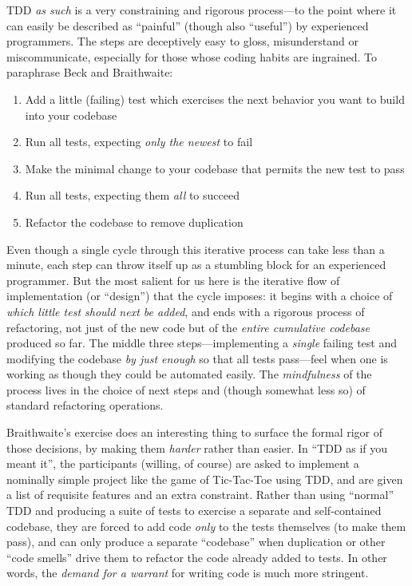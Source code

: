 TDD \emph{as such} is a very constraining and rigorous process---to the point where it can easily be described as ``painful'' (though also ``useful'') by experienced programmers. The steps are deceptively easy to gloss, misunderstand or miscommunicate, especially for those whose coding habits are ingrained. To paraphrase Beck and Braithwaite:

\begin{enumerate}
\item Add a little (failing) test which exercises the next behavior you want to build into your codebase
\item Run all tests, expecting \emph{only the newest} to fail
\item Make the minimal change to your codebase that permits the new test to pass
\item Run all tests, expecting them \emph{all} to succeed
\item Refactor the codebase to remove duplication
\end{enumerate}

Even though a single cycle through this iterative process can take less than a minute, each step can throw itself up as a stumbling block for an experienced programmer. But the most salient for us here is the iterative flow of implementation (or ``design'') that the cycle imposes: it begins with a choice of \emph{which little test should next be added}, and ends with a rigorous process of refactoring, not just of the new code but of the \emph{entire cumulative codebase} produced so far. The middle three steps---implementing a \emph{single} failing test and modifying the codebase \emph{by just enough} so that all tests pass---feel when one is working as though they could be automated easily. The \emph{mindfulness} of the process lives in the choice of next steps and (though somewhat less so) of standard refactoring operations.

Braithwaite's exercise does an interesting thing to surface the formal rigor of those decisions, by making them \emph{harder} rather than easier. In ``TDD as if you meant it'', the participants (willing, of course) are asked to implement a nominally simple project like the game of Tic-Tac-Toe using TDD, and are given a list of requisite features and an extra constraint. Rather than using ``normal'' TDD and producing a suite of tests to exercise a separate and self-contained codebase, they are forced to add code \emph{only} to the tests themselves (to make them pass), and can only produce a separate ``codebase'' when duplication or other ``code smells'' drive them to refactor the code already added to tests. In other words, the \emph{demand for a warrant} for writing code is much more stringent.

